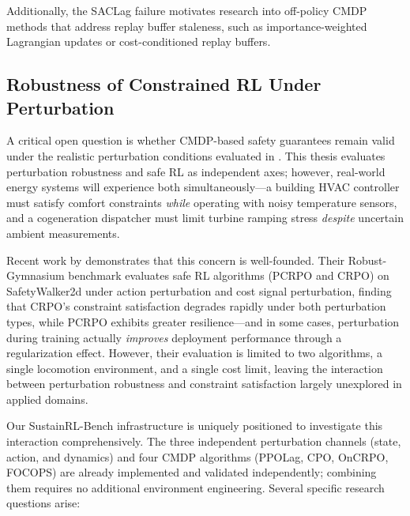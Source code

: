 Additionally, the SACLag failure motivates research into off-policy CMDP methods that address replay buffer staleness, such as importance-weighted Lagrangian updates or cost-conditioned replay buffers.

\subsection{Robustness of Constrained RL Under Perturbation}

A critical open question is whether CMDP-based safety guarantees remain valid under the realistic perturbation conditions evaluated in . This thesis evaluates perturbation robustness and safe RL as independent axes; however, real-world energy systems will experience both simultaneously---a building HVAC controller must satisfy comfort constraints \emph{while} operating with noisy temperature sensors, and a cogeneration dispatcher must limit turbine ramping stress \emph{despite} uncertain ambient measurements.

Recent work by \citet{gu2025robustgymnasium} demonstrates that this concern is well-founded. Their Robust-Gymnasium benchmark evaluates safe RL algorithms (PCRPO and CRPO) on SafetyWalker2d under action perturbation and cost signal perturbation, finding that CRPO's constraint satisfaction degrades rapidly under both perturbation types, while PCRPO exhibits greater resilience---and in some cases, perturbation during training actually \emph{improves} deployment performance through a regularization effect. However, their evaluation is limited to two algorithms, a single locomotion environment, and a single cost limit, leaving the interaction between perturbation robustness and constraint satisfaction largely unexplored in applied domains.

Our SustainRL-Bench infrastructure is uniquely positioned to investigate this interaction comprehensively. The three independent perturbation channels (state, action, and dynamics) and four CMDP algorithms (PPOLag, CPO, OnCRPO, FOCOPS) are already implemented and validated independently; combining them requires no additional environment engineering. Several specific research questions arise:


